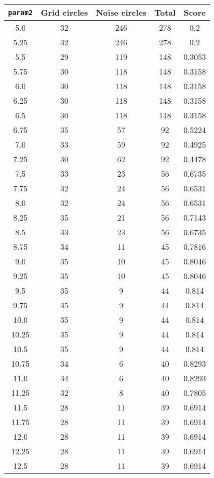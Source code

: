 \documentclass[letterpaper, 12pt]{article}
\begin{document}
\begin{longtable}{|c|c|c|c|c|}
\hline
\textbf{\texttt{param2}} & \textbf{Grid circles} & \textbf{Noise circles} & \textbf{Total} & \textbf{Score} \\
\hline
5.0 & 32 & 246 & 278 & 0.2 \\
\hline
5.25 & 32 & 246 & 278 & 0.2 \\
\hline
5.5 & 29 & 119 & 148 & 0.3053 \\
\hline
5.75 & 30 & 118 & 148 & 0.3158 \\
\hline
6.0 & 30 & 118 & 148 & 0.3158 \\
\hline
6.25 & 30 & 118 & 148 & 0.3158 \\
\hline
6.5 & 30 & 118 & 148 & 0.3158 \\
\hline
6.75 & 35 & 57 & 92 & 0.5224 \\
\hline
7.0 & 33 & 59 & 92 & 0.4925 \\
\hline
7.25 & 30 & 62 & 92 & 0.4478 \\
\hline
7.5 & 33 & 23 & 56 & 0.6735 \\
\hline
7.75 & 32 & 24 & 56 & 0.6531 \\
\hline
8.0 & 32 & 24 & 56 & 0.6531 \\
\hline
8.25 & 35 & 21 & 56 & 0.7143 \\
\hline
8.5 & 33 & 23 & 56 & 0.6735 \\
\hline
8.75 & 34 & 11 & 45 & 0.7816 \\
\hline
9.0 & 35 & 10 & 45 & 0.8046 \\
\hline
9.25 & 35 & 10 & 45 & 0.8046 \\
\hline
9.5 & 35 & 9 & 44 & 0.814 \\
\hline
9.75 & 35 & 9 & 44 & 0.814 \\
\hline
10.0 & 35 & 9 & 44 & 0.814 \\
\hline
10.25 & 35 & 9 & 44 & 0.814 \\
\hline
10.5 & 35 & 9 & 44 & 0.814 \\
\hline
10.75 & 34 & 6 & 40 & 0.8293 \\
\hline
11.0 & 34 & 6 & 40 & 0.8293 \\
\hline
11.25 & 32 & 8 & 40 & 0.7805 \\
\hline
11.5 & 28 & 11 & 39 & 0.6914 \\
\hline
11.75 & 28 & 11 & 39 & 0.6914 \\
\hline
12.0 & 28 & 11 & 39 & 0.6914 \\
\hline
12.25 & 28 & 11 & 39 & 0.6914 \\
\hline
12.5 & 28 & 11 & 39 & 0.6914 \\

\end{longtable}
\end{document}
